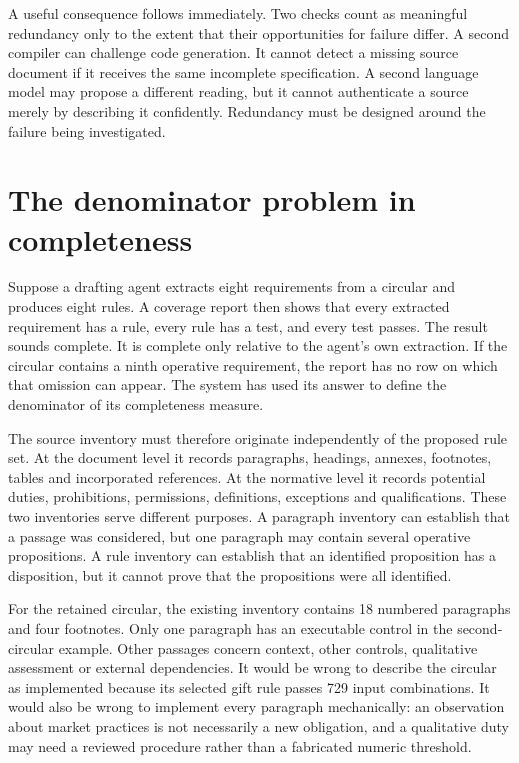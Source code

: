 A useful consequence follows immediately. Two checks count as meaningful
redundancy only to the extent that their opportunities for failure differ. A
second compiler can challenge code generation. It cannot detect a missing source
document if it receives the same incomplete specification. A second language
model may propose a different reading, but it cannot authenticate a source merely
by describing it confidently. Redundancy must be designed around the failure
being investigated.

\section{The denominator problem in completeness}
\label{sec:problem-denominator}
Suppose a drafting agent extracts eight requirements from a circular and produces
eight rules. A coverage report then shows that every extracted requirement has a
rule, every rule has a test, and every test passes. The result sounds complete.
It is complete only relative to the agent's own extraction. If the circular
contains a ninth operative requirement, the report has no row on which that
omission can appear. The system has used its answer to define the denominator
of its completeness measure.

The source inventory must therefore originate independently of the proposed
rule set. At the document level it records paragraphs, headings, annexes,
footnotes, tables and incorporated references. At the normative level it records
potential duties, prohibitions, permissions, definitions, exceptions and
qualifications. These two inventories serve different purposes. A paragraph
inventory can establish that a passage was considered, but one paragraph may
contain several operative propositions. A rule inventory can establish that an
identified proposition has a disposition, but it cannot prove that the
propositions were all identified.

For the retained circular, the existing inventory contains 18 numbered
paragraphs and four footnotes. Only one paragraph has an executable control in
the second-circular example. Other passages concern context, other controls,
qualitative assessment or external dependencies. It would be wrong to describe
the circular as implemented because its selected gift rule passes 729 input
combinations. It would also be wrong to implement every paragraph mechanically:
an observation about market practices is not necessarily a new obligation, and a
qualitative duty may need a reviewed procedure rather than a fabricated numeric
threshold.

